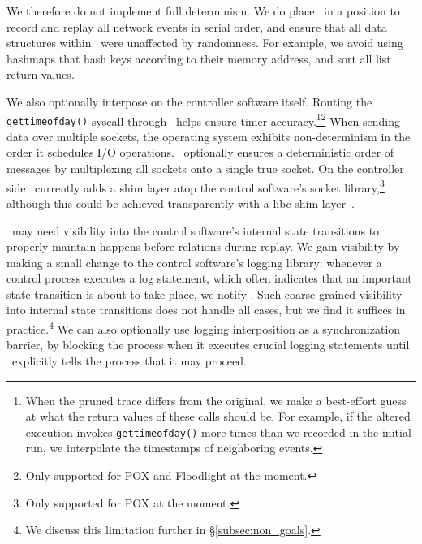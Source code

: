 We therefore do not implement full determinism. We do place \projectname~in a position to
record and replay all network events in serial order, and ensure that all
data structures within \projectname~were unaffected by randomness. For example,
we avoid using hashmaps that hash keys according to their memory address,
and sort all list return values.

We also optionally interpose on the controller software itself.
Routing the {\tt gettimeofday()} syscall through \projectname~helps ensure timer
accuracy.\footnote{When the pruned trace differs from the original, we make a
best-effort guess at what the return values of these calls should be. For example,
if the altered execution invokes {\tt gettimeofday()} more times than we recorded
in the initial run, we interpolate the timestamps of neighboring events.}\footnote{Only
supported for POX and Floodlight at the moment.\label{fn:pox_fl}} When sending data over multiple sockets, the operating system exhibits
non-determinism in the order it schedules I/O operations.
\projectname~optionally ensures a deterministic order of messages
by multiplexing all sockets
onto a single true socket. On the controller side \projectname~currently
adds a shim layer atop the control
software's socket library,\footnote{Only supported for POX at the moment.} although this
could be achieved transparently with a libc shim layer~\cite{Geels:2006:RDD:1267359.1267386}.

\projectname~may need visibility into the control software's internal state
transitions to properly maintain happens-before relations during replay. We
gain visibility by making a
small change to the control software's logging library: whenever a control process executes a log
statement, which often indicates that an important state transition is about to take
place, we notify \projectname. Such coarse-grained visibility into internal
state transitions does not handle all cases, but we find it suffices in practice.\footnote{We discuss this limitation further in \S\ref{subsec:non_goals}.}
We can also optionally use
logging interposition as a
synchronization barrier, by blocking the process when it executes crucial logging statements
until \projectname~explicitly tells the process that it may proceed.


